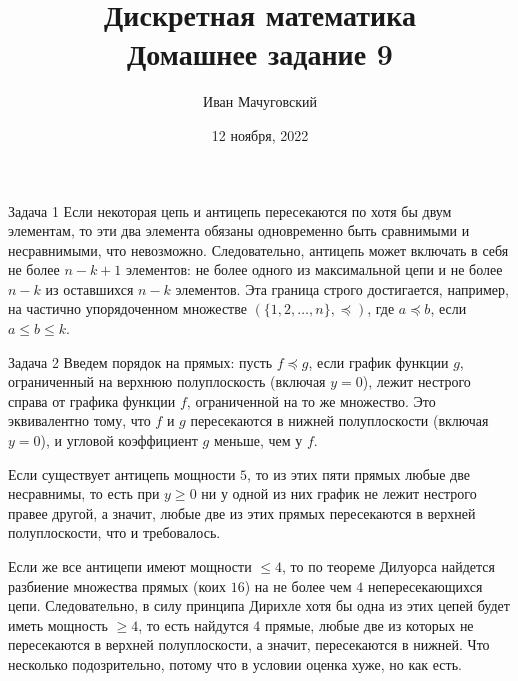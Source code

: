 \documentclass{article}
\date{12 ноября, 2022}
\title{Дискретная математика \\ \Large Домашнее задание 9}
\author{Иван Мачуговский}
\begin{document}
	\maketitle

	\begin{section}{Задача 1}
		Если некоторая цепь и антицепь пересекаются по хотя бы двум элементам, то эти два элемента обязаны одновременно быть сравнимыми и несравнимыми, что невозможно. Следовательно, антицепь может включать в себя не более $n - k + 1$ элементов: не более одного из максимальной цепи и не более $n - k$ из оставшихся $n - k$ элементов. Эта граница строго достигается, например, на частично упорядоченном множестве $(\{1, 2, \dots, n\}, \preceq)$, где $a \preceq b$, если $a \le b \le k$.
	\end{section}

	\begin{section}{Задача 2}
		Введем порядок на прямых: пусть $f \preceq g$, если график функции $g$, ограниченный на верхнюю полуплоскость (включая $y = 0$), лежит нестрого справа от графика функции $f$, ограниченной на то же множество. Это эквивалентно тому, что $f$ и $g$ пересекаются в нижней полуплоскости (включая $y = 0$), и угловой коэффициент $g$ меньше, чем у $f$.

		Если существует антицепь мощности $5$, то из этих пяти прямых любые две несравнимы, то есть при $y \ge 0$ ни у одной из них график не лежит нестрого правее другой, а значит, любые две из этих прямых пересекаются в верхней полуплоскости, что и требовалось.

		Если же все антицепи имеют мощности $\le 4$, то по теореме Дилуорса найдется разбиение множества прямых (коих $16$) на не более чем $4$ непересекающихся цепи. Следовательно, в силу принципа Дирихле хотя бы одна из этих цепей будет иметь мощность $\ge 4$, то есть найдутся $4$ прямые, любые две из которых не пересекаются в верхней полуплоскости, а значит, пересекаются в нижней. Что несколько подозрительно, потому что в условии оценка хуже, но как есть.
	\end{section}
\end{document}
